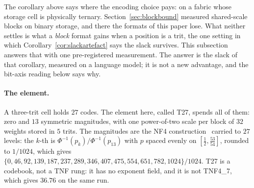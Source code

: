 The corollary above says where the encoding choice pays: on a fabric whose
storage cell is physically ternary. Section~\ref{sec:blockbound} measured
shared-scale blocks on binary storage, and there the formats of this paper
lose. What neither settles is what a \emph{block} format
gains when a position is a trit, the one setting in which
Corollary~\ref{cor:slackartefact} says the slack survives. This subsection
answers that with one pre-registered measurement. The answer is the slack of
that corollary, measured on a language model; it is not a new advantage, and
the bit-axis reading below says why.

\paragraph{The element.} A three-trit cell holds $27$ codes. The element here,
called T27, spends all of them: zero and $13$ symmetric magnitudes, with one
power-of-two scale per block of $32$ weights stored in $5$ trits. The magnitudes
are the NF4 construction~\cite{qlora} carried to $27$ levels: the $k$-th is
$\Phi^{-1}(p_k)/\Phi^{-1}(p_{13})$ with $p$ spaced evenly on
$[\tfrac12,\tfrac{53}{54}]$, rounded to $1/1024$, which gives
$\{0,46,92,139,187,237,289,346,407,475,554,651,782,1024\}/1024$. T27 is a
codebook, not a TNF rung: it has no exponent field, and it is not TNF4\_7, which
gives $36.76$ on the same run.

